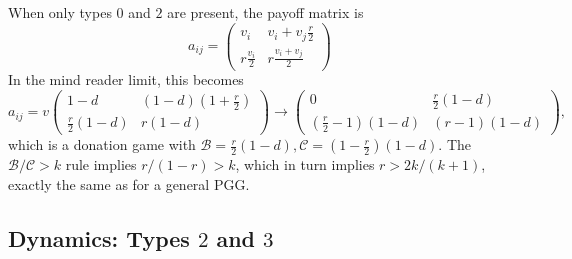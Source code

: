 \documentclass[13pt]{amsart}
\newcommand{\B}{\mathcal{B}}
\newcommand{\C}{\mathcal{C}}
\begin{document}
When only types $0$ and $2$ are present, the payoff matrix is
\begin{equation}
    a_{ij} =
    \begin{pmatrix}
        v_i & v_i + v_j\frac{r}{2} \\
        r\frac{v_i}{2} & r\frac{v_i + v_j}{2}
    \end{pmatrix}
\end{equation}
In the mind reader limit, this becomes
\begin{equation}
    a_{ij} = v
    \begin{pmatrix}
        1-d & (1-d)(1+\frac{r}{2}) \\
        \frac{r}{2}(1-d) & r(1-d)
    \end{pmatrix}
    \to
    \begin{pmatrix}
        0 & \frac{r}{2}(1-d) \\
        (\frac{r}{2} - 1)(1-d) & (r-1)(1-d)
    \end{pmatrix},
\end{equation}
which is a donation game with $\B = \frac{r}{2}(1-d), \C = (1-\frac{r}{2})(1-d)$.
The $\B/\C > k$ rule implies $r/(1-r) > k$, which in turn implies $r > 2k/(k+1)$, exactly the same as for a general PGG.

\subsection*{Dynamics: Types $2$ and $3$}
\end{document}
